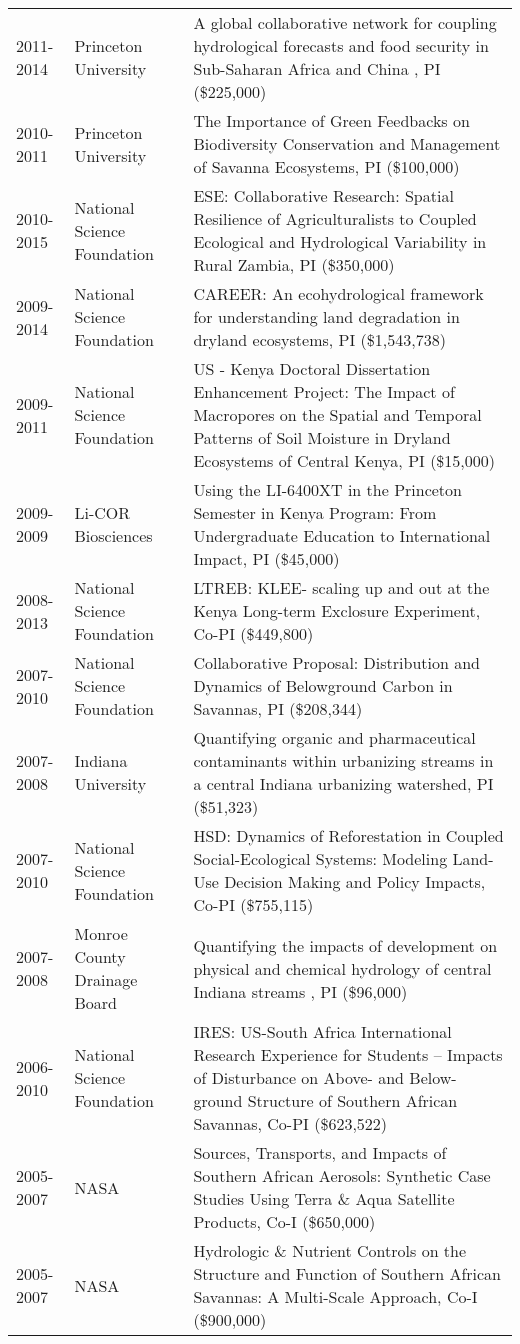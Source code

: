 \begin{longtable}{p{1.75cm}>{\raggedright}p{}p{12cm}}
2011-2014 & Princeton University & A global collaborative network for coupling hydrological forecasts and food security in Sub-Saharan Africa and China , PI (\$225,000) \\ 
2010-2011 & Princeton University & The Importance of Green Feedbacks on Biodiversity Conservation and Management of Savanna Ecosystems, PI (\$100,000) \\ 
2010-2015 & National Science Foundation & ESE: Collaborative Research: Spatial Resilience of Agriculturalists to Coupled Ecological and Hydrological Variability in Rural Zambia, PI (\$350,000) \\ 
2009-2014 & National Science Foundation & CAREER: An ecohydrological framework for understanding land degradation in dryland ecosystems, PI (\$1,543,738) \\ 
2009-2011 & National Science Foundation & US - Kenya Doctoral Dissertation Enhancement Project: The Impact of Macropores on the Spatial and Temporal Patterns of Soil Moisture in Dryland Ecosystems of Central Kenya, PI (\$15,000) \\ 
2009-2009 & Li-COR Biosciences & Using the LI-6400XT in the Princeton Semester in Kenya Program: From Undergraduate Education to International Impact, PI (\$45,000) \\ 
2008-2013 & National Science Foundation & LTREB: KLEE- scaling up and out at the Kenya Long-term Exclosure Experiment, Co-PI (\$449,800) \\ 
2007-2010 & National Science Foundation & Collaborative Proposal: Distribution and Dynamics of Belowground Carbon in Savannas, PI (\$208,344) \\ 
2007-2008 & Indiana University & Quantifying organic and pharmaceutical contaminants within urbanizing streams in a central Indiana urbanizing watershed, PI (\$51,323) \\ 
2007-2010 & National Science Foundation & HSD: Dynamics of Reforestation in Coupled Social-Ecological Systems: Modeling Land-Use Decision Making and Policy Impacts, Co-PI (\$755,115) \\ 
2007-2008 & Monroe County Drainage Board & Quantifying the impacts of development on physical and chemical hydrology of central Indiana streams , PI (\$96,000) \\ 
2006-2010 & National Science Foundation & IRES: US-South Africa International Research Experience for Students -- Impacts of Disturbance on Above- and Below-ground Structure of Southern African Savannas, Co-PI (\$623,522) \\ 
2005-2007 & NASA & Sources, Transports, and Impacts of Southern African Aerosols: Synthetic Case Studies Using Terra \& Aqua Satellite Products, Co-I (\$650,000) \\ 
2005-2007 & NASA & Hydrologic \& Nutrient Controls on the Structure and Function of Southern African Savannas: A Multi-Scale Approach, Co-I (\$900,000) \\ 

\end{longtable}
